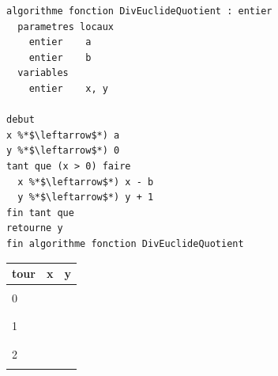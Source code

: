 \documentclass[11pt,a4paper]{article}
\begin{document}
\begin{table}[h!]
  \centering
  \begin{minipage}{0.59\textwidth}
    \centering
\begin{lstlisting}[style=algorithmique]
algorithme fonction DivEuclideQuotient : entier
  parametres locaux
    entier    a
    entier    b
  variables
    entier    x, y

debut
x %*$\leftarrow$*) a
y %*$\leftarrow$*) 0
tant que (x > 0) faire
  x %*$\leftarrow$*) x - b
  y %*$\leftarrow$*) y + 1
fin tant que
retourne y
fin algorithme fonction DivEuclideQuotient \end{lstlisting}
  \end{minipage}
  \hfillx
  \begin{minipage}{0.4\textwidth}
    \centering
    \begin{tabular}{|C{1cm}|C{1cm}|C{1cm}|}
        \hline
        tour &  x &   y   \\
        \hline
             &    &       \\
        0    &    &       \\
             &    &       \\
        \hline
             &    &       \\
        1    &    &       \\
             &    &       \\
        \hline
             &    &       \\
        2    &    &       \\
             &    &       \\

\end{tabular}
\end{minipage}
\end{table}
\end{document}
